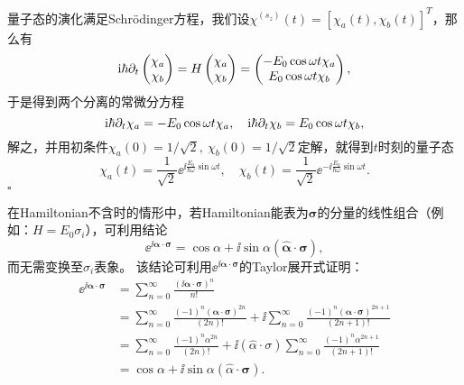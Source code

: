 \begin{tcolorbox}[breakable, title={\textbf{例题}}]
    量子态的演化满足Schrödinger方程，我们设$\chi^{(s_z)}(t)=[\chi_a(t), \chi_b(t)]^T$，那么有
    \begin{equation}
        \mathrm{i}\hbar\partial_t \begin{pmatrix}\chi_a \\ \chi_b \end{pmatrix}
        = H \begin{pmatrix} \chi_a \\ \chi_b \end{pmatrix}
        = \begin{pmatrix} -E_0 \cos\omega t \chi_a \\ E_0 \cos\omega t \chi_b \end{pmatrix},
    \end{equation}
    于是得到两个分离的常微分方程
    \begin{equation}
        \mathrm{i}\hbar\partial_t \chi_a = -E_0 \cos\omega t \chi_a,\quad
        \mathrm{i}\hbar\partial_t \chi_b =  E_0 \cos\omega t \chi_b,
    \end{equation}
    解之，并用初条件$\chi_a(0)=1/\sqrt2,\ \chi_b(0)=1/\sqrt2$定解，就得到$t$时刻的量子态
    \begin{equation}
        \chi_a(t) = \frac{1}{\sqrt{2}} \ee^{\ii\frac{E_0}{\hbar\omega}\sin\omega t},\quad
        \chi_b(t) = \frac{1}{\sqrt{2}} \ee^{-\ii\frac{E_0}{\hbar\omega}\sin\omega t}.
    \end{equation}
    \hfill$\square$
\end{tcolorbox}

在Hamiltonian不含时的情形中，若Hamiltonian能表为$\bm{\sigma}$的分量的线性组合（例如：$H=E_0\sigma_i$），可利用结论
\begin{equation}
    \label{eq:spin_exp_pauli}
    \ee^{\ii \bm{\alpha}\cdot\bm{\sigma}} = \cos\alpha + \ii \sin\alpha (\hat{\bm{\alpha}}\cdot\bm{\sigma}),
\end{equation}
而无需变换至$\sigma_i$表象。
该结论可利用$\ee^{\ii \bm{\alpha}\cdot\bm{\sigma}}$的Taylor展开式证明：
\begin{equation}
\begin{aligned}
    \ee^{\ii \bm{\alpha}\cdot\bm{\sigma}}
    &= \sum_{n=0}^\infty \frac{(\ii \bm{\alpha}\cdot\bm{\sigma})^n}{n!}\\
    &= \sum_{n=0}^\infty \frac{(-1)^n (\bm{\alpha}\cdot\bm{\sigma})^{2n}}{(2n)!} + \ii \sum_{n=0}^\infty \frac{(-1)^n (\bm{\alpha}\cdot\bm{\sigma})^{2n+1}}{(2n+1)!}\\
    &= \sum_{n=0}^\infty \frac{(-1)^n \alpha^{2n}}{(2n)!} + \ii (\hat{\alpha}\cdot\sigma) \sum_{n=0}^\infty \frac{(-1)^n \alpha^{2n+1}}{(2n+1)!}\\
    &= \cos\alpha + \ii \sin\alpha (\hat{\alpha}\cdot\bm{\sigma}).
\end{aligned}
\end{equation}

